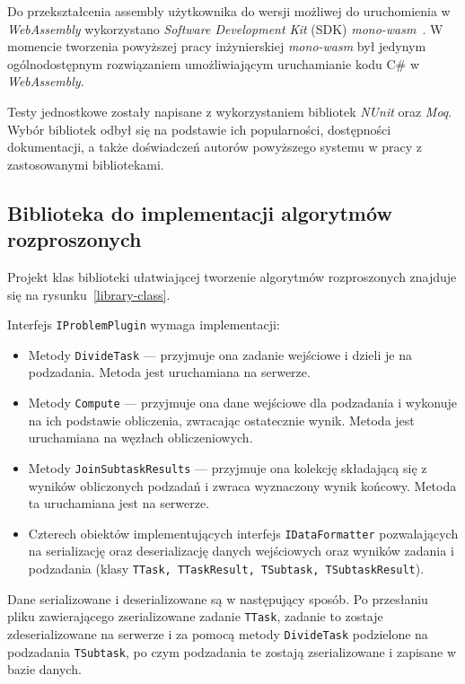 \documentclass[a4paper,11pt,twoside]{report}
\theoremstyle{definition}
\begin{document}
Do przekształcenia assembly użytkownika do wersji możliwej do uruchomienia w \textit{WebAssembly} wykorzystano \textit{Software Development Kit} (SDK) \textit{mono-wasm}~\cite{mono-wasm}. W momencie tworzenia powyższej pracy inżynierskiej \textit{mono-wasm} był jedynym ogólnodostępnym rozwiązaniem umożliwiającym uruchamianie kodu C\# w \textit{WebAssembly}.

Testy jednostkowe zostały napisane z wykorzystaniem bibliotek \textit{NUnit} oraz \textit{Moq}. Wybór bibliotek odbył się na podstawie ich popularności, dostępności dokumentacji, a także doświadczeń autorów powyższego systemu w pracy z zastosowanymi bibliotekami.

\subsection{Biblioteka do implementacji algorytmów rozproszonych}
\label{biblioteka-szczegoly}

Projekt klas biblioteki ułatwiającej tworzenie algorytmów rozproszonych znajduje się na rysunku~\ref{library-class}.

Interfejs \texttt{IProblemPlugin} wymaga implementacji:
\begin{itemize}
    \item Metody \texttt{DivideTask} --- przyjmuje ona zadanie wejściowe i dzieli je na podzadania. Metoda jest uruchamiana na serwerze.
    \item Metody \texttt{Compute} --- przyjmuje ona dane wejściowe dla podzadania i wykonuje na ich podstawie obliczenia, zwracając ostatecznie wynik. Metoda jest uruchamiana na węzłach obliczeniowych.
    \item Metody \texttt{JoinSubtaskResults} --- przyjmuje ona kolekcję składającą się z wyników obliczonych podzadań i zwraca wyznaczony wynik końcowy. Metoda ta uruchamiana jest na serwerze.
    \item Czterech obiektów implementujących interfejs \texttt{IDataFormatter} pozwalających na serializację oraz deserializację danych wejściowych oraz wyników zadania i podzadania (klasy \texttt{TTask, TTaskResult, TSubtask, TSubtaskResult}).
\end{itemize}

Dane serializowane i deserializowane są w następujący sposób. Po przesłaniu pliku zawierającego zserializowane zadanie \texttt{TTask}, zadanie to zostaje zdeserializowane na serwerze i za pomocą metody \texttt{DivideTask} podzielone na podzadania \texttt{TSubtask}, po czym podzadania te zostają zserializowane i zapisane w bazie danych.
\end{document}
